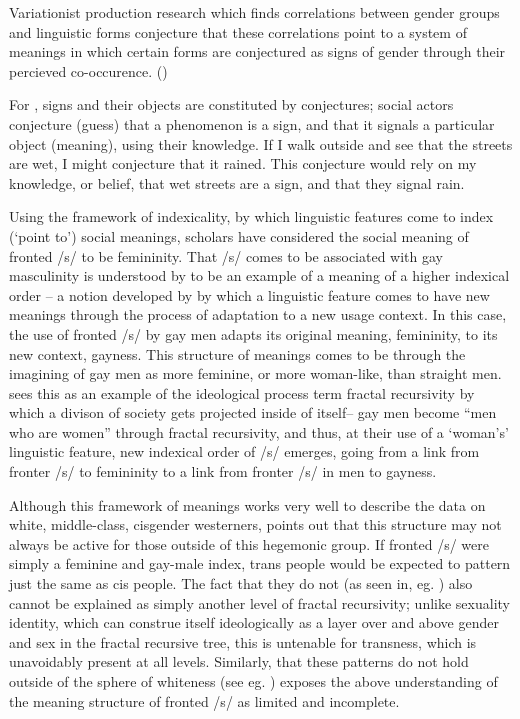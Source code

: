 Variationist production research which finds correlations between gender groups and linguistic forms conjecture that these correlations point to a system of meanings in which certain forms are conjectured as signs of gender through their percieved co-occurence. (\cite{gal_signs_2019, calder_interrogating_2025})


For \textcite{gal_signs_2019}, signs and their objects are constituted by conjectures; social actors conjecture (guess) that a phenomenon is a sign, and that it signals a particular object (meaning), using their knowledge. If I walk outside and see that the streets are wet, I might conjecture that it rained. This conjecture would rely on my knowledge, or belief, that wet streets are a sign, and that they signal rain.

Using the framework of indexicality, by which linguistic features come to index (`point to') social meanings, scholars have considered the social meaning of fronted /s/ to be femininity. That /s/ comes to be associated with gay masculinity is understood by \textcite{calder_sissy_2019} to be an example of a meaning of a higher indexical order -- a notion developed by \textcite{silverstein_indexical_2003} by which a linguistic feature comes to have new meanings through the process of adaptation to a new usage context. In this case, the use of fronted /s/ by gay men adapts its original meaning, femininity, to its new context, gayness. This structure of meanings comes to be through the imagining of gay men as more feminine, or more woman-like, than straight men. \textcite{calder_sissy_2019} sees this as an example of the ideological process \textcite{irvine_language_2000} term fractal recursivity by which a divison of society gets projected inside of itself-- gay men become ``men who are women'' through fractal recursivity, and thus, at their use of a `woman's' linguistic feature, new indexical order of /s/ emerges, going from a link from fronter /s/ to femininity to a link from fronter /s/ in men to gayness.

Although this framework of meanings works very well to describe the data on white, middle-class, cisgender westerners,  \textcite{calder_whose_2021}  points out that this structure may not always be active for those outside of this hegemonic group. If fronted /s/ were simply a feminine and gay-male index, trans people would be expected to pattern just the same as cis people. The fact that they do not (as seen in, eg. \cite{hazenberg_language_2012, podesva_sexuality_2015, zimman_hegemonic_2013}) also cannot be explained as simply another level of fractal recursivity; unlike sexuality identity, which can construe itself ideologically as a layer over and above gender and sex in the fractal recursive tree, this is untenable for transness, which is unavoidably present at all levels. Similarly, that these patterns do not hold outside of the sphere of whiteness (see eg. \cite{calder_whose_2022, jessee_cisgender_2025, maegaard_s_2015}) exposes the above understanding of the meaning structure of fronted /s/ as limited and incomplete. 

